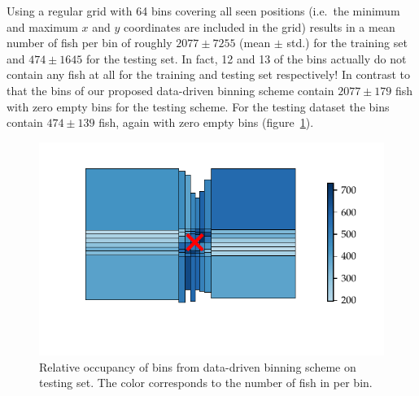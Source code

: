 \documentclass[nobib, a4paper]{tufte-handout}
\begin{document}
Using a regular grid with 64 bins covering all seen positions (i.e.\ the minimum and maximum $x$ and $y$ coordinates are included in the grid) results in a mean number of fish per bin of roughly \(2077\pm 7255\) (mean $\pm$ std.) for the training set and \(474 \pm 1645\) for the testing set.
In fact, 12 and 13 of the bins actually do not contain any fish at all for the training and testing set respectively!
In contrast to that the bins of our proposed data-driven binning scheme contain $2077 \pm 179$ fish with zero empty bins for the testing scheme.
For the testing dataset the bins contain $474 \pm 139$ fish, again with zero empty bins (figure~\ref{fig:occupancy}).

\begin{figure}[htb]
  \includegraphics{rf_occupancy_test}
   \centering
   \caption{Relative occupancy of bins from data-driven binning scheme on testing set.
   The color corresponds to the number of fish in per bin.}
   \label{fig:occupancy}
\end{figure}
\end{document}
